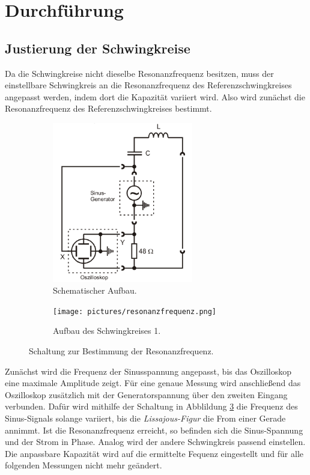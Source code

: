 \newpage
\section{Durchführung}
\label{sec:Durchführung}


\subsection{Justierung der Schwingkreise}

Da die Schwingkreise nicht dieselbe Resonanzfrequenz besitzen, muss der einstellbare Schwingkreis an die Resonanzfrequenz
des Referenzschwingkreises angepasst werden, indem dort die Kapazität variiert wird.
Also wird zunächst die Resonanzfrequenz des Referenzschwingkreises bestimmt.

\begin{figure} 
    \begin{subfigure}{0.48\textwidth}
        \centering
        \includegraphics[height=7cm] {pictures/messschaltung.png} 
        \caption{Schematischer Aufbau. \cite{v355}}
        \label{fig:schema}
    \end{subfigure}
    \hfill
    \begin{subfigure}{0.48\textwidth}
        \centering
        \texttt{[image: pictures/resonanzfrequenz.png]} 
        \caption{Aufbau des Schwingkreises 1.}
        \label{fig:foto}
    \end{subfigure}
    \caption{Schaltung zur Bestimmung der Resonanzfrequenz.}
    \label{fig:messschaltung}
\end{figure} 

Zunächst wird die Frequenz der Sinusspannung angepasst, bis das Oszilloskop eine maximale Amplitude zeigt.
Für eine genaue Messung wird anschließend das Oszilloskop zusätzlich mit der Generatorspannung über den zweiten Eingang verbunden.
Dafür wird mithilfe der Schaltung in Abblildung \ref{fig:messschaltung} die Frequenz des Sinus-Signals solange variiert,
bis die \textit{Lissajous-Figur} die From einer Gerade annimmt. 
Ist die Resonanzfrequenz erreicht, so befinden sich die Sinus-Spannung und der Strom in Phase.
Analog wird der andere Schwingkreis passend einstellen.
Die anpassbare Kapazität wird auf die ermittelte Fequenz eingestellt
und für alle folgenden Messungen nicht mehr geändert.

